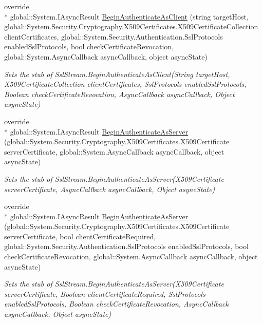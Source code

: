 \begin{DoxyCompactItemize}
override \\*
global\-::\-System.\-I\-Async\-Result \hyperlink{class_system_1_1_net_1_1_security_1_1_fakes_1_1_stub_ssl_stream_a1035db5a3ad04873a7a471cbd2090266}{Begin\-Authenticate\-As\-Client} (string target\-Host, global\-::\-System.\-Security.\-Cryptography.\-X509\-Certificates.\-X509\-Certificate\-Collection client\-Certificates, global\-::\-System.\-Security.\-Authentication.\-Ssl\-Protocols enabled\-Ssl\-Protocols, bool check\-Certificate\-Revocation, global\-::\-System.\-Async\-Callback async\-Callback, object async\-State)
\begin{DoxyCompactList}\small\item\em Sets the stub of Ssl\-Stream.\-Begin\-Authenticate\-As\-Client(\-String target\-Host, X509\-Certificate\-Collection client\-Certificates, Ssl\-Protocols enabled\-Ssl\-Protocols, Boolean check\-Certificate\-Revocation, Async\-Callback async\-Callback, Object async\-State)\end{DoxyCompactList}\item 
override \\*
global\-::\-System.\-I\-Async\-Result \hyperlink{class_system_1_1_net_1_1_security_1_1_fakes_1_1_stub_ssl_stream_a2c43517052ae33d47a77837543f14f30}{Begin\-Authenticate\-As\-Server} (global\-::\-System.\-Security.\-Cryptography.\-X509\-Certificates.\-X509\-Certificate server\-Certificate, global\-::\-System.\-Async\-Callback async\-Callback, object async\-State)
\begin{DoxyCompactList}\small\item\em Sets the stub of Ssl\-Stream.\-Begin\-Authenticate\-As\-Server(\-X509\-Certificate server\-Certificate, Async\-Callback async\-Callback, Object async\-State)\end{DoxyCompactList}\item 
override \\*
global\-::\-System.\-I\-Async\-Result \hyperlink{class_system_1_1_net_1_1_security_1_1_fakes_1_1_stub_ssl_stream_a332a9f52a1bf80418e5b20302d139e69}{Begin\-Authenticate\-As\-Server} (global\-::\-System.\-Security.\-Cryptography.\-X509\-Certificates.\-X509\-Certificate server\-Certificate, bool client\-Certificate\-Required, global\-::\-System.\-Security.\-Authentication.\-Ssl\-Protocols enabled\-Ssl\-Protocols, bool check\-Certificate\-Revocation, global\-::\-System.\-Async\-Callback async\-Callback, object async\-State)
\begin{DoxyCompactList}\small\item\em Sets the stub of Ssl\-Stream.\-Begin\-Authenticate\-As\-Server(\-X509\-Certificate server\-Certificate, Boolean client\-Certificate\-Required, Ssl\-Protocols enabled\-Ssl\-Protocols, Boolean check\-Certificate\-Revocation, Async\-Callback async\-Callback, Object async\-State)\end{DoxyCompactList}\item 

\end{DoxyCompactItemize}

